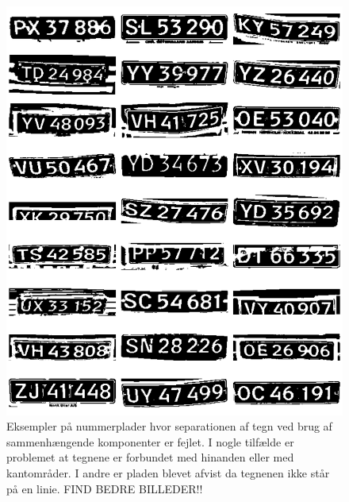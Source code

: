 \documentclass[11pt,a4paper,final]{article}
\begin{document}
\begin{figure}[htp]
\centering
\includegraphics[width=12cm]{appendix/illu/separation_errors.png} 
\caption{Eksempler på nummerplader hvor separationen af tegn ved brug af sammenhængende komponenter er fejlet. I nogle tilfælde er problemet at tegnene er forbundet med hinanden eller med kantområder. I andre er pladen blevet afvist da tegnenen ikke står på en linie. FIND BEDRE BILLEDER!!}
\label{fig:illu:separation_errors}
\end{figure}
\end{document}
